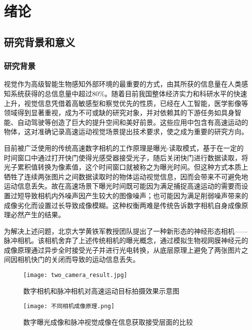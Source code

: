 
\chapter{绪论}

\section{研究背景和意义}

\subsection{研究背景}
视觉作为高级智能生物感知外部环境的最重要的方式，由其所获的信息量在人类感知系统获得的总信息量中超过80\%\cite{Ernst2002}。随着目前我国整体经济实力和科研水平的快速上升，视觉信息凭借着高敏感型和察觉优先的性质，已经在人工智能，医学影像等领域得到显著重视，成为不可或缺的研究对象，并对依赖其的下游任务如具身智能、自动驾驶等创造了巨大的提升空间和美好前景。这些应用中包含有高速运动的物体，这对准确记录高速运动视觉场景提出技术要求，使之成为重要的研究方向。

目前被广泛使用的传统高速数字相机的工作原理是曝光-读取模式，基于在一定的时间窗口中通过打开快门使得光感受器接受光子，随后关闭快门进行数据读取，将光子累积值转换为像素值，这个时间窗口就被称之为曝光时间。但这种方式本质上牺牲了连续两张图片之间数据读取时的物体运动视觉信息，因而会带来不可避免地运动信息丢失。故在高速场景下曝光时间既可能因为满足捕捉高速运动的需要而设置过短导致相机内外噪声因产生较大的图像噪声；也可能因为满足削弱噪声带来的成像劣化而设置过长导致成像模糊。这种权衡两难是传统告诉数字相机自身成像原理必然产生的结果。

为解决上述问题，北京大学黄铁军教授团队提出了一种新形态的神经形态相机——脉冲相机\cite{Huang_Tiejun110}。该相机舍弃了上述传统相机的曝光概念，通过模拟生物视网膜神经元的成像原理通过异步全时接受光子并进行光电转换，从底层原理上避免了两张图片之间因相机快门的关闭而导致的运动信息丢失。

\begin{figure}[ht]
  \centering
  \texttt{[image: two\_camera\_result.jpg]}
  \caption{数字相机和脉冲相机对高速运动目标拍摄效果示意图}
  \label{fig:two_camera_result}
\end{figure}    
\begin{figure}[ht]
  \centering
  \texttt{[image: 不同相机成像原理.png]}
  \caption{数字曝光成像和脉冲视觉成像在信息获取接受层面的比较}
  \label{fig:two_camera_result_tenet}
\end{figure}    
